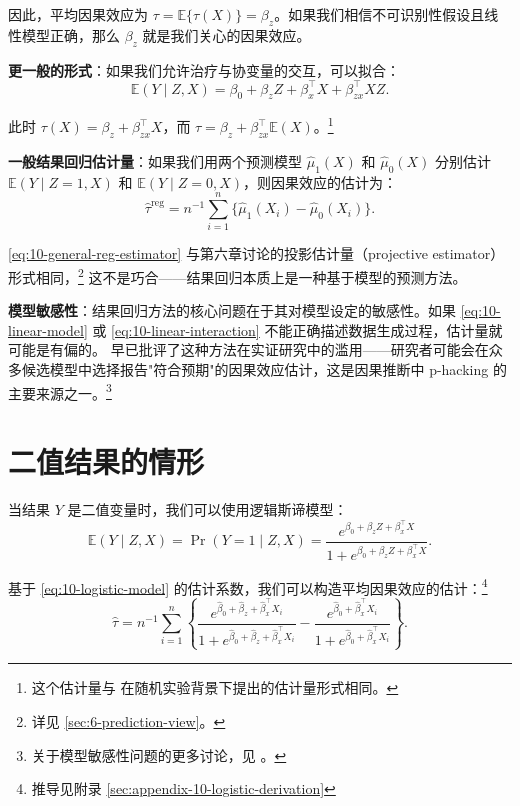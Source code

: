 因此，平均因果效应为 $\tau = \mathbb{E}\{\tau(X)\} = \beta_z$。如果我们相信不可识别性假设且线性模型正确，那么 $\beta_z$ 就是我们关心的因果效应。

\textbf{更一般的形式}：如果我们允许治疗与协变量的交互，可以拟合：
\begin{equation}
\mathbb{E}(Y \mid Z, X) = \beta_0 + \beta_z Z + \beta_x^{\top} X + \beta_{zx}^{\top} X Z.
\label{eq:10-linear-interaction}
\end{equation}

此时 $\tau(X) = \beta_z + \beta_{zx}^{\top} X$，而 $\tau = \beta_z + \beta_{zx}^{\top} \mathbb{E}(X)$。\footnote{这个估计量与 \cite{Lin:2013} 在随机实验背景下提出的估计量形式相同。}

\textbf{一般结果回归估计量}：如果我们用两个预测模型 $\hat{\mu}_1(X)$ 和 $\hat{\mu}_0(X)$ 分别估计 $\mathbb{E}(Y \mid Z = 1, X)$ 和 $\mathbb{E}(Y \mid Z = 0, X)$，则因果效应的估计为：
\begin{equation}
\hat{\tau}^{\text{reg}} = n^{-1} \sum_{i=1}^n \{\hat{\mu}_1(X_i) - \hat{\mu}_0(X_i)\}.
\label{eq:10-general-reg-estimator}
\end{equation}

\cref{eq:10-general-reg-estimator} 与第六章讨论的投影估计量（projective estimator）形式相同，\footnote{详见 \cref{sec:6-prediction-view}。} 这不是巧合——结果回归本质上是一种基于模型的预测方法。

\textbf{模型敏感性}：结果回归方法的核心问题在于其对模型设定的敏感性。如果 \cref{eq:10-linear-model} 或 \cref{eq:10-linear-interaction} 不能正确描述数据生成过程，估计量就可能是有偏的。\cite{Leamer:1978} 早已批评了这种方法在实证研究中的滥用——研究者可能会在众多候选模型中选择报告"符合预期"的因果效应估计，这是因果推断中 p-hacking 的主要来源之一。\footnote{关于模型敏感性问题的更多讨论，见 \citealp[Problem 1.4]{Ding:2023}。}

\section{二值结果的情形}\label{sec:10-binary-outcome}

当结果 $Y$ 是二值变量时，我们可以使用逻辑斯谛模型：
\begin{equation}
\mathbb{E}(Y \mid Z, X) = \Pr(Y = 1 \mid Z, X) = \frac{e^{\beta_0 + \beta_z Z + \beta_x^{\top} X}}{1 + e^{\beta_0 + \beta_z Z + \beta_x^{\top} X}}.
\label{eq:10-logistic-model}
\end{equation}

基于 \cref{eq:10-logistic-model} 的估计系数，我们可以构造平均因果效应的估计：\footnote{推导见附录 \cref{sec:appendix-10-logistic-derivation}}
\[
\hat{\tau} = n^{-1} \sum_{i=1}^n \left\{
\frac{e^{\hat{\beta}_0 + \hat{\beta}_z + \hat{\beta}_x^{\top} X_i}}{1 + e^{\hat{\beta}_0 + \hat{\beta}_z + \hat{\beta}_x^{\top} X_i}}
- \frac{e^{\hat{\beta}_0 + \hat{\beta}_x^{\top} X_i}}{1 + e^{\hat{\beta}_0 + \hat{\beta}_x^{\top} X_i}}
\right\}.
\]

